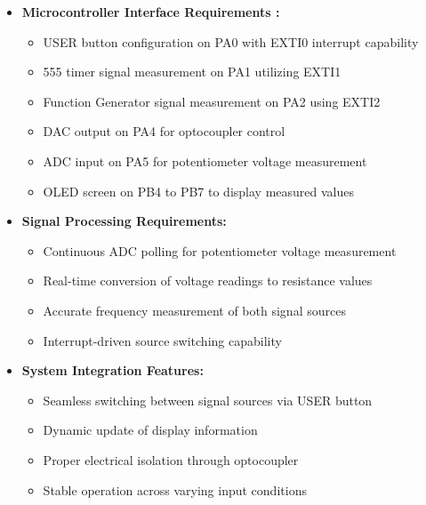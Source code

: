 \begin{itemize}[leftmargin=2em]
    \item \textbf{Microcontroller Interface Requirements \cite{lab-manual}:}
    \begin{itemize}
        \item USER button configuration on PA0 with EXTI0 interrupt capability
        \item 555 timer signal measurement on PA1 utilizing EXTI1
        \item Function Generator signal measurement on PA2 using EXTI2
        \item DAC output on PA4 for optocoupler control
        \item ADC input on PA5 for potentiometer voltage measurement
        \item OLED screen on PB4 to PB7 to display measured values
    \end{itemize}
    
    \item \textbf{Signal Processing Requirements: ~\cite{lab-manual}}
    \begin{itemize}
        \item Continuous ADC polling for potentiometer voltage measurement
        \item Real-time conversion of voltage readings to resistance values
        \item Accurate frequency measurement of both signal sources
        \item Interrupt-driven source switching capability
    \end{itemize}
    
    \item \textbf{System Integration Features:}
    \begin{itemize}
        \item Seamless switching between signal sources via USER button
        \item Dynamic update of display information
        \item Proper electrical isolation through optocoupler
        \item Stable operation across varying input conditions
    \end{itemize}


\end{itemize}
